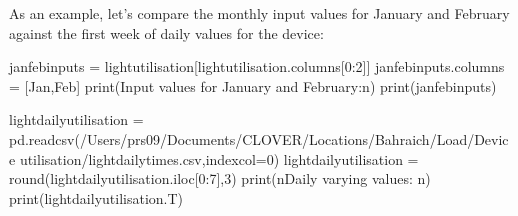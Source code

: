 \documentclass[letterpaper,10pt,english]{sphinxmanual}
\begin{document}
\sphinxAtStartPar
As an example, let’s compare the monthly input values for January and
February against the first week of daily values for the 
device:

\begin{sphinxVerbatim}[commandchars=\\\{\}]
jan\PYGZus{}feb\PYGZus{}inputs = light\PYGZus{}utilisation[light\PYGZus{}utilisation.columns[0:2]]
jan\PYGZus{}feb\PYGZus{}inputs.columns = [\PYGZsq{}Jan\PYGZsq{},\PYGZsq{}Feb\PYGZsq{}]
print(\PYGZsq{}Input values for January and February:\PYGZbs{}n\PYGZsq{})
print(jan\PYGZus{}feb\PYGZus{}inputs)

light\PYGZus{}daily\PYGZus{}utilisation = pd.read\PYGZus{}csv(\PYGZdq{}/Users/prs09/Documents/CLOVER/Locations/Bahraich/Load/Device utilisation/light\PYGZus{}daily\PYGZus{}times.csv\PYGZdq{},index\PYGZus{}col=0)
light\PYGZus{}daily\PYGZus{}utilisation = round(light\PYGZus{}daily\PYGZus{}utilisation.iloc[0:7],3)
print(\PYGZsq{}\PYGZbs{}nDaily varying values: \PYGZbs{}n\PYGZsq{})
print(light\PYGZus{}daily\PYGZus{}utilisation.T)
\end{sphinxVerbatim}
\end{document}
